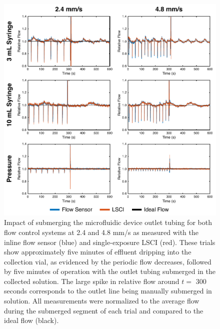 \documentclass{article}
\begin{document}
\begin{figure}
    \includegraphics[width=\textwidth]{FigureS1.pdf}
    \caption {
        Impact of submerging the microfluidic device outlet tubing for both flow control systems at 2.4 and 4.8 mm/s as measured with the inline flow sensor (blue) and single-exposure LSCI (red). These trials show approximately five minutes of effluent dripping into the collection vial, as evidenced by the periodic flow decreases, followed by five minutes of operation with the outlet tubing submerged in the collected solution. The large spike in relative flow around $t = $ 300 seconds corresponds to the outlet line being manually submerged in solution. All measurements were normalized to the average flow during the submerged segment of each trial and compared to the ideal flow (black).
    }
    \label{fig:supplement_outlet}
\end{figure}
\end{document}
